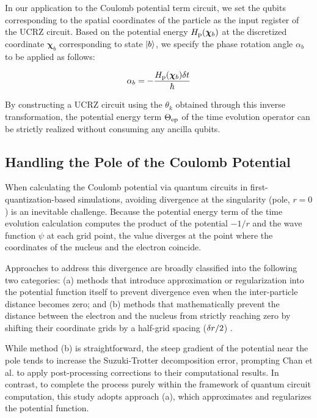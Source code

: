 \documentclass[report_2025.tex]{subfiles}
\begin{document}
In our application to the Coulomb potential term circuit, we set the qubits
corresponding to the spatial coordinates of the particle as the input register
of the UCRZ circuit. Based on the potential energy $H_{\mathrm{p}}(\bm{\chi}_b)$ at the
discretized coordinate $\bm{\chi}_b$ corresponding to state $\ket{b}$, we
specify the phase rotation angle $\alpha_b$ to be applied as follows:

\begin{equation}
\alpha_b = -\frac{H_{\mathrm{p}}(\bm{\chi}_b)\delta t}{\hbar}
\end{equation}

By constructing a UCRZ circuit using the $\theta_k$ obtained through this
inverse transformation, the potential energy term $\Theta_{\mathrm{ep}}$ of the time
evolution operator can be strictly realized without consuming any ancilla
qubits.

\subsection{Handling the Pole of the Coulomb Potential}
\label{sec:coulomb-potential-handling}
When calculating the Coulomb potential via quantum circuits in
first-quantization-based simulations, avoiding divergence at the singularity
(pole, $r=0$) is an inevitable challenge. Because the potential energy term of
the time evolution calculation computes the product of the potential $-1/r$ and
the wave function $\psi$ at each grid point, the value diverges at the point
where the coordinates of the nucleus and the electron coincide.

Approaches to address this divergence are broadly classified into the following
two categories: (a) methods that introduce approximation or regularization into
the potential function itself to prevent divergence even when the inter-particle
distance becomes zero; and (b) methods that mathematically prevent the distance
between the electron and the nucleus from strictly reaching zero by shifting
their coordinate grids by a half-grid spacing ($\delta r/2$)
\cite{Chan2023.sciadv.abo7484}.

While method (b) is straightforward, the steep gradient of the potential near
the pole tends to increase the Suzuki-Trotter decomposition error, prompting
Chan et al. to apply post-processing corrections to their computational results.
In contrast, to complete the process purely within the framework of quantum
circuit computation, this study adopts approach (a), which approximates and
regularizes the potential function.
\end{document}
